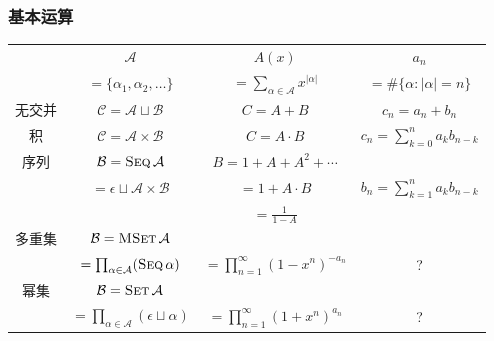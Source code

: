 \documentclass{ctexbeamer}
\DeclareMathOperator{\MSet}{\textsc{MSet}}
\DeclareMathOperator{\Set}{\textsc{Set}}
\DeclareMathOperator{\Seq}{\textsc{Seq}}
\begin{document}
\begin{frame}
  \frametitle{基本运算}

  \begin{table}[htbp]
    \centering
    \begin{tabular}{cccc}
        \toprule
          & \huge $\mathcal A$ & \huge $A(x)$ & \huge $a_n$ \\
          & $ = \{ \alpha_1,\alpha_2,\dots \}$ & $\displaystyle = \sum_{\alpha\in \mathcal A} x^{|\alpha|}$ & $\displaystyle = \# \{\alpha : |\alpha| = n\}$ \\
        \midrule
          无交并 & $\mathcal C = \mathcal A \sqcup \mathcal B$ & $C = A+B$ & $c_n=a_n+b_n$ \\
        \midrule
          积 & $\mathcal C = \mathcal A \times \mathcal B$ & $C = A\cdot B$ & $c_n=\sum_{k=0}^n a_k b_{n-k}$ \\
        \midrule
          序列 & $\mathcal B = \Seq \mathcal A$ & $B = 1 + A + A^2 + \cdots$ & \\
              & $ = \epsilon \sqcup \mathcal A \times \mathcal B$ & $= 1 + A\cdot B$ & $b_n = \sum_{k=1}^n a_k b_{n-k}$ \\
              &    & $= \frac 1{1-A}$ & \\
        \midrule
          多重集 & $\mathcal B = \MSet \mathcal A$ &  & \\
                & $= \prod_{\alpha\in \mathcal A} (\Seq \alpha)$ & $= \prod_{n=1}^\infty (1 - x^n)^{-a_n}$ & ? \\
        \midrule
          幂集  & $\mathcal B = \Set \mathcal A$ &  & \\
          & $= \prod_{\alpha\in \mathcal A} (\epsilon \sqcup \alpha)$ & $= \prod_{n=1}^\infty (1 + x^n)^{a_n}$ & ? \\
        \bottomrule
    \end{tabular}
  \end{table}

\end{frame}
\end{document}
